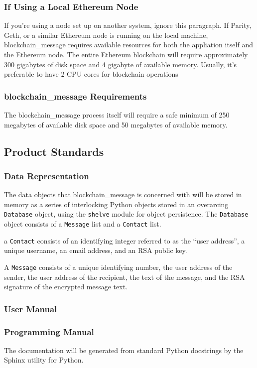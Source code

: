 \documentclass[titlepage]{report}
\begin{document}
\subsubsection{If Using a Local Ethereum Node}
If you're using a node set up on another system, ignore this paragraph. If Parity, Geth, or a similar Ethereum node is running on the local machine, blockchain\_message requires available resources for both the appliation itself and the Ethereum node. The entire Ethereum blockchain will require approximately 300 gigabytes of disk space and 4 gigabyte of available memory. Usually, it's preferable to have 2 CPU cores for blockchain operations

\subsubsection{blockchain\_message Requirements}
The blockchain\_message process itself will require a safe minimum of 250 megabytes of available disk space and 50 megabytes of available memory.

\subsection{Product Standards}
\subsubsection{Data Representation}
The data objects that blockchain\_message is concerned with will be stored in memory as a series of interlocking Python objects stored in an overarcing \texttt{Database} object, using the \texttt{shelve} module for object persistence. The \texttt{Database} object consists of a \texttt{Message} list and a \texttt{Contact} list.

a \texttt{Contact} consists of an identifying integer referred to as the ``user address'', a unique username, an email address, and an RSA public key.

A \texttt{Message} consists of a unique identifying number, the user address of the sender, the user address of the recipient, the text of the message, and the RSA signature of the encrypted message text.

\subsubsection{User Manual}
\subsubsection{Programming Manual}
The documentation will be generated from standard Python docstrings by the Sphinx utility for Python.
\end{document}
